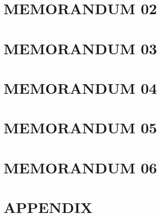 \documentclass[paper=A4, fontsize=11pt, titlepage]{article}
\numberwithin{equation}{section}
\numberwithin{figure}{section}
\numberwithin{table}{section}
\newcommand*{\sectionpostamble}{}
\newcommand*{\fromto}[1]{\def\sectionpostamble{#1}}
\begin{document}




\clearpage


\fromto{May 5 - May 9}
\section{MEMORANDUM 02}




\clearpage


\fromto{May 12 - May 16}
\section{MEMORANDUM 03}




\clearpage


\fromto{May 19 - May 23}
\section{MEMORANDUM 04}




\clearpage


\fromto{May 26 - May 30}
\section{MEMORANDUM 05}




\clearpage


\fromto{Jun 02 - Jun 06}
\section{MEMORANDUM 06}




\clearpage


\section{APPENDIX}
\end{document}
